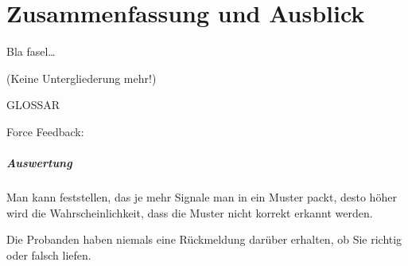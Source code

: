 
\chapter{Zusammenfassung und Ausblick}
\label{ch:Zusammenfassung}
Bla fasel\ldots

(Keine Untergliederung mehr!)




GLOSSAR

Force Feedback:




\paragraph{Auswertung}
Man kann feststellen, das je mehr Signale man in ein Muster packt, desto höher wird die Wahrscheinlichkeit, dass die Muster nicht korrekt erkannt werden. 

Die Probanden haben niemals eine Rückmeldung darüber erhalten, ob Sie richtig oder falsch liefen.
